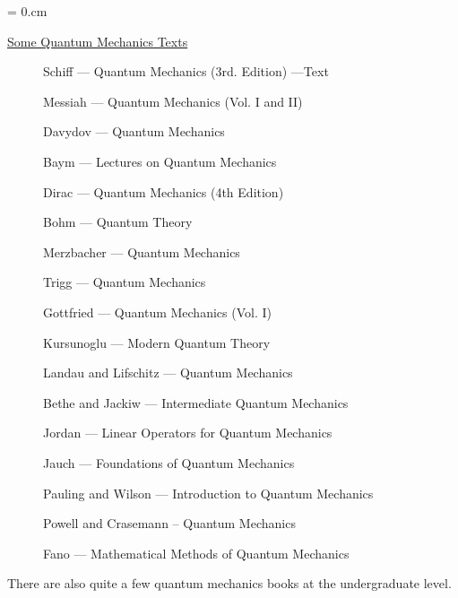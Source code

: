 



\baselineskip=14pt
\parindent = 0.cm
\setlength{\parskip}{\baselineskip}
\noindent

\twelverm

\baselineskip 16pt

\tableofcontents
%
\newpage

\underline{Some Quantum Mechanics Texts}

\begin{description}
\item[] Schiff  --- Quantum Mechanics (3rd. Edition) ---Text
\item[] Messiah --- Quantum Mechanics (Vol. I and II) 
\item[] Davydov --- Quantum Mechanics 
\item[] Baym    --- Lectures on Quantum Mechanics
\item[] Dirac   --- Quantum Mechanics (4th Edition)
\item[] Bohm    --- Quantum Theory
\item[] Merzbacher --- Quantum Mechanics
\item[] Trigg   --- Quantum Mechanics
\item[] Gottfried --- Quantum Mechanics (Vol. I)
\item[] Kursunoglu --- Modern Quantum Theory
\item[] Landau and Lifschitz --- Quantum Mechanics 
\item[] Bethe and Jackiw --- Intermediate Quantum Mechanics
\item[] Jordan --- Linear Operators for Quantum Mechanics
\item[] Jauch --- Foundations of Quantum Mechanics
\item[] Pauling and Wilson --- Introduction to Quantum Mechanics
\item[] Powell and Crasemann -- Quantum Mechanics
\item[] Fano --- Mathematical Methods of Quantum Mechanics
\end{description}

There are also quite a few quantum mechanics books at the undergraduate
level.

\newpage


     

